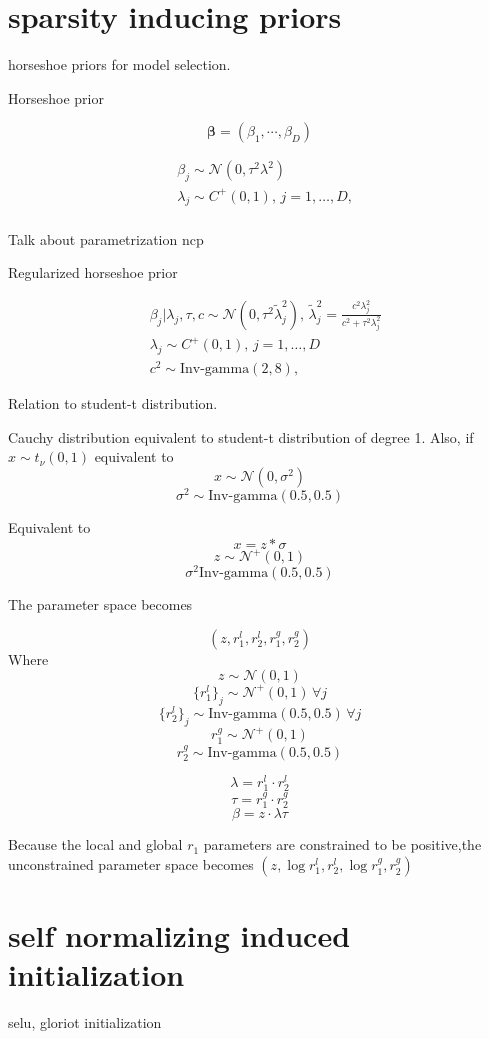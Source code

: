 \documentclass[]{report}
\begin{document}
\section{sparsity inducing priors}
horseshoe priors for model selection.

Horseshoe prior \cite{piironen2017sparsity}

\[ \mathbf{\beta} = (\beta_1,\cdots,\beta_D)\]

\begin{align*}
 &\beta_j \sim \mathcal{N}(0,\tau^2\lambda^2) \\
 &\lambda_j \sim C^+(0,1),\, j = 1,\dots , D, \\
\end{align*}

Talk about parametrization ncp 

Regularized horseshoe prior 

\begin{align*}
&\beta_j | \lambda_j, \tau, c \sim \mathcal{N}(0,\tau^2 \tilde{\lambda}_j^2) ,\, \tilde{\lambda}_j^2 = \frac{c^2 \lambda_j^2}{c^2 + \tau^2 \lambda_j^2} \\
&\lambda_j \sim C^+(0,1),\, j = 1,\dots,D\\
&c^2 \sim \text{Inv-gamma}(2,8) ,
\end{align*}

Relation to student-t distribution. 

Cauchy distribution equivalent to student-t distribution of degree 1. Also, if $x \sim t_{\nu}(0,1) $ 
equivalent to 
\[ x \sim \mathcal{N}(0,\sigma^2)\]
\[\sigma^2 \sim \text{Inv-gamma}(0.5,0.5) \]

Equivalent to 
\[ x = z * \sigma \]
\[ z \sim \mathcal{N}^+(0,1)\]
\[\sigma^2 \text{Inv-gamma}(0.5,0.5) \]

The parameter space becomes 

\[(z,r_1^l,r_2^l,r_1^g,r_2^g) \]
Where
\[ z \sim \mathcal{N}(0,1) \]
\[ \{r_1^l\}_j \sim \mathcal{N}^+(0,1) \, \forall j \]
\[ \{r_2^l\}_j \sim \text{Inv-gamma}(0.5,0.5) \, \forall j  \]
\[ r_1^g \sim \mathcal{N}^+(0,1)  \]
\[ r_2^g \sim \text{Inv-gamma}(0.5,0.5)   \]

\[ \lambda =  r_1^l \cdot r_2^l \]
\[ \tau = r_1^g \cdot r_2^g \]
\[\beta = z \cdot \lambda \tau \]

Because the local and global $r_1$ parameters are constrained to be positive,the unconstrained parameter space becomes $(z,\log r_1^l,r_2^l,\log r_1^g,r_2^g)$

\section{self normalizing induced initialization}
selu, gloriot initialization
\end{document}
